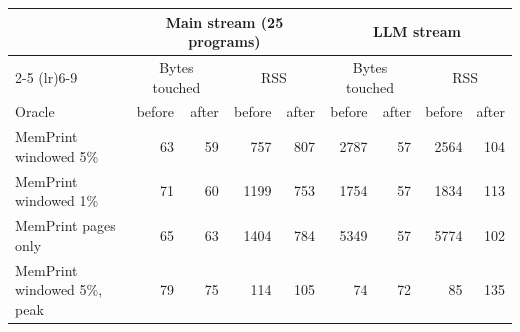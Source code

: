 \begin{tabular}{lrrrrrrrr}
\toprule
 & \multicolumn{4}{c}{Main stream (25 programs)} & \multicolumn{4}{c}{LLM stream} \\
\cmidrule(lr){2-5} \cmidrule(lr){6-9}
 & \multicolumn{2}{c}{Bytes touched} & \multicolumn{2}{c}{RSS} & \multicolumn{2}{c}{Bytes touched} & \multicolumn{2}{c}{RSS} \\
Oracle & before & after & before & after & before & after & before & after \\
\midrule
MemPrint windowed 5\% & 63 & 59 & 757 & 807 & 2787 & 57 & 2564 & 104 \\
MemPrint windowed 1\% & 71 & 60 & 1199 & 753 & 1754 & 57 & 1834 & 113 \\
MemPrint pages only & 65 & 63 & 1404 & 784 & 5349 & 57 & 5774 & 102 \\
MemPrint windowed 5\%, peak & 79 & 75 & 114 & 105 & 74 & 72 & 85 & 135 \\
\bottomrule
\end{tabular}

